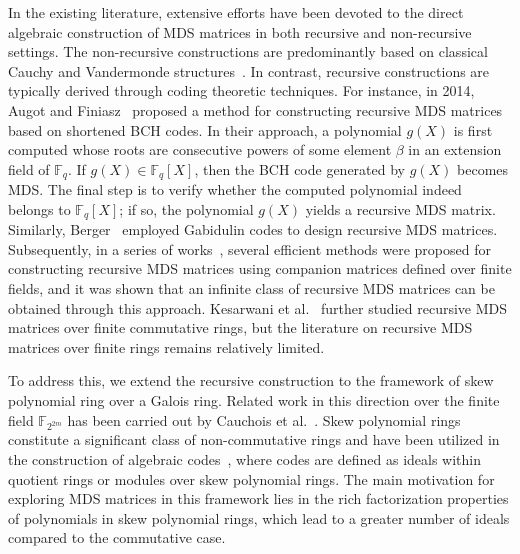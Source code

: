 \documentclass[11pt]{article}
\begin{document}
In the existing literature, extensive efforts have been devoted to the direct algebraic construction of MDS matrices in both recursive and non-recursive settings. The non-recursive constructions are predominantly based on classical Cauchy and Vandermonde structures~\cite{chand2013constructions, gupta2019cryptographically,lacan2004systematic,sajadieh2012construction}. In contrast, recursive constructions are typically derived through coding theoretic techniques. For instance, in 2014, Augot and Finiasz~\cite{augot2014direct} proposed a method for constructing recursive MDS matrices based on shortened BCH codes. In their approach, a polynomial \( g(X) \) is first computed whose roots are consecutive powers of some element \( \beta \) in an extension field of \( \mathbb{F}_q \). If \( g(X) \in \mathbb{F}_q[X] \), then the BCH code generated by \( g(X) \) becomes MDS. The final step is to verify whether the computed polynomial indeed belongs to \( \mathbb{F}_q[X] \); if so, the polynomial \( g(X) \) yields a recursive MDS matrix. Similarly, Berger~\cite{berger2013construction} employed Gabidulin codes to design recursive MDS matrices. Subsequently, in a series of works~\cite{Guptadirect, gupta2017towards,gupta2019almost}, several efficient methods were proposed for constructing recursive MDS matrices using companion matrices defined over finite fields, and it was shown that an infinite class of recursive MDS matrices can be obtained through this approach.
Kesarwani et al.~\cite{Kesarwani2021} further studied recursive MDS matrices over finite commutative rings, but the literature on recursive MDS matrices over finite rings remains relatively limited.

To address this, we extend the recursive construction to the framework of skew polynomial ring over a Galois ring. Related work in this direction over the finite field $\mathbb{F}_{2^{2m}}$ has been carried out by Cauchois et al.~\cite{Cauchois2016direct}. Skew polynomial rings constitute a significant class of non-commutative rings and have been utilized in the construction of algebraic codes~\cite{Boulagouaz2013codes,Bhaintwal2012Skew}, where codes are defined as ideals within quotient rings or modules over skew polynomial rings. The main motivation for exploring MDS matrices in this framework lies in the rich factorization properties of polynomials in skew polynomial rings, which lead to a greater number of ideals compared to the commutative case. 
\end{document}
